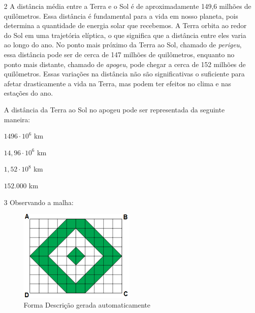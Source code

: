 {{{\begin{escolha}
{{{{{\begin{escolha}
\begin{escolha}
{\begin{q°}
{\begin{enumerate}
{\num{2} A distância média entre a Terra e o Sol é de aproximadamente 149,6
milhões de quilômetros. Essa distância é fundamental para a vida em
nosso planeta, pois determina a quantidade de energia solar que
recebemos. A Terra orbita ao redor do Sol em uma trajetória elíptica,
o que significa que a distância entre eles varia ao longo do ano. No
ponto mais próximo da Terra ao Sol, chamado de \textit{perigeu}, essa distância
pode ser de cerca de 147 milhões de quilômetros, enquanto no ponto
mais distante, chamado de \textit{apogeu}, pode chegar a cerca de 152 milhões
de quilômetros. Essas variações na distância não são significativas o
suficiente para afetar drasticamente a vida na Terra, mas podem ter
efeitos no clima e nas estações do ano.

A distância da Terra ao Sol no apogeu pode ser representada da seguinte maneira:

\begin{escolha}

  \item $1496 \cdot 10^{6}$ km 

  \item $14,96 \cdot 10^{6}$ km 

  \item $1,52 \cdot 10^{8}$ km 

  \item $152.000$ km

\end{escolha}


\num{3} Observando a malha:

\begin{figure}
\centering
\includegraphics[width=2.23809in,height=1.77753in]{./_SAEB_9_MAT/media/image240.png}
\caption{Forma Descrição gerada automaticamente}
\end{figure}

}
\end{enumerate}}
\end{q°}}
\end{escolha}
\end{escolha}}}}}}
\end{escolha}}}}
